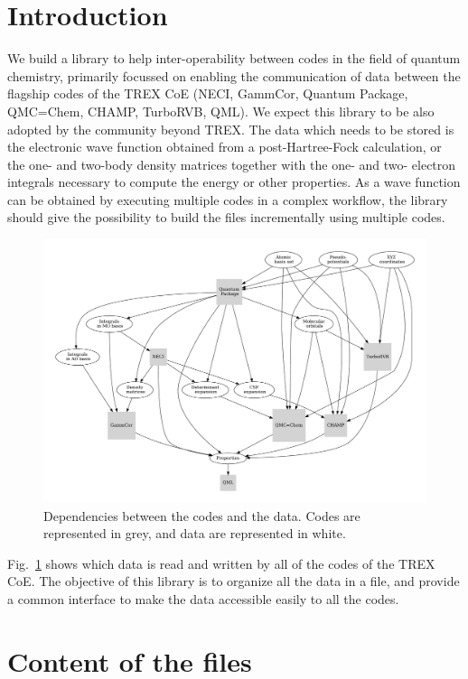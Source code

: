 \section{Introduction}

We build a library to help inter-operability between codes
in the field of quantum chemistry, primarily focussed on enabling the
communication of data between the flagship codes of the \ac{TREX}
\ac{CoE} (NECI, GammCor, Quantum Package, QMC=Chem, CHAMP, TurboRVB,
QML). We expect this library to be also adopted by the community beyond
\ac{TREX}.
The data which needs to be stored is the electronic wave function
obtained from a post-Hartree-Fock calculation, or the one- and
two-body density matrices together with the one- and two- electron
integrals necessary to compute the energy or other properties.
As a wave function can be obtained by executing multiple codes
in a complex workflow, the library should give the possibility to
build the files incrementally using multiple codes.

\begin{figure}[h]
  \centering
  \includegraphics[width=\textwidth]{codes.pdf}
  \caption{Dependencies between the codes and the data. Codes are
    represented in grey, and data are represented in white.}
  \label{fig:codes}
\end{figure}

Fig.~\ref{fig:codes} shows which data is read and written by all of
the codes of the \ac{TREX} \ac{CoE}. The objective of this library is
to organize all the data in a file, and provide a common interface to
make the data accessible easily to all the codes.

\section{Content of the files}

